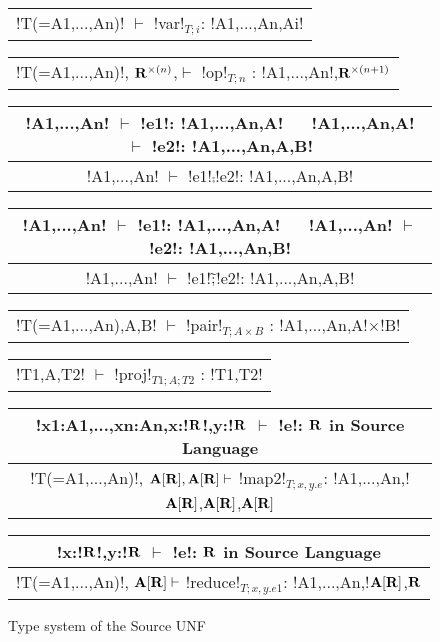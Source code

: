 \begin{figure*}[tb]
    \centering
    \begin{tabular}{c} 
    \\\hline
    !T(=A1,...,An)! $\vdash$ !var!$_{T;i}$: !A1,...,An,Ai!
    \end{tabular}
    \hspace{0.5cm}
    \begin{tabular}{c}
        \\\hline
        !T(=A1,...,An)!, $\mathbf{R}^{\times(n)}$,$\vdash$ !op!$_{T;n}$ : !A1,...,An!,$\mathbf{R}^{\times(n+1)}$
    \end{tabular}

    \begin{tabular}{c}
    !A1,...,An! $\vdash$ !e1!: !A1,...,An,A! $\quad$ !A1,...,An,A! $\vdash$ !e2!: !A1,...,An,A,B! \\\hline
    !A1,...,An! $\vdash$ !e1!$\comp$!e2!: !A1,...,An,A,B!
    \end{tabular}
    \hspace{0.5cm}
    \begin{tabular}{c}
        !A1,...,An! $\vdash$ !e1!: !A1,...,An,A! $\quad$ !A1,...,An! $\vdash$ !e2!: !A1,...,An,B! \\\hline
        !A1,...,An! $\vdash$ !e1!$\widetilde{;}$!e2!: !A1,...,An,A,B!
    \end{tabular}

    \begin{tabular}{c}
        \\\hline
        !T(=A1,...,An),A,B! $\vdash$ !pair!$_{T;A\times B}$ : !A1,...,An,A!$\times$!B!
    \end{tabular}

    \begin{tabular}{c}
        \\\hline
        !T1,A,T2! $\vdash$ !proj!$_{T1;A;T2}$ : !T1,T2!
    \end{tabular}

    \begin{tabular}{c}
        !x1:A1,...,xn:An,x:!$\mathbf{R}$!,y:!$\mathbf{R}$ $\vdash$ !e!: $\mathbf{R}$ in Source Language
        \\\hline  
        !T(=A1,...,An)!, $\mathbf{A}[\mathbf{R}],\mathbf{A}[\mathbf{R}] \vdash$ !map2!$_{T; x,y.e}$: !A1,...,An,!$\mathbf{A}[\mathbf{R}]$,$\mathbf{A}[\mathbf{R}]$,$\mathbf{A}[\mathbf{R}]$
    \end{tabular}

    \begin{tabular}{c}
        !x:!$\mathbf{R}$!,y:!$\mathbf{R}$ $\vdash$ !e!: $\mathbf{R}$ in Source Language
        \\\hline  
        !T(=A1,...,An)!, $\mathbf{A}[\mathbf{R}] \vdash$ !reduce!$_{T; x,y.e1}$: !A1,...,An,!$\mathbf{A}[\mathbf{R}]$,$\mathbf{R}$
    \end{tabular}
    \vspace{-0.2cm}
    \caption{Type system of the Source UNF}
    \vspace{-0.4cm}
    \label{fig:source_unf_typesystem}
\end{figure*}